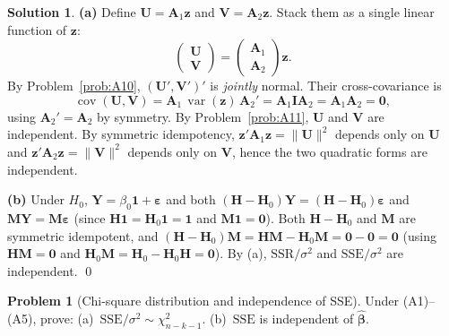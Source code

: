 \documentclass[12pt,a4paper]{article}
\theoremstyle{definition}
\newtheorem{exercise}{Problem}
\newtheorem*{solution*}{Solution}
\DeclareMathOperator\var{var}
\DeclareMathOperator\cov{cov}
\newcommand{\SSR}{\mathrm{SSR}}
\newcommand{\SSE}{\mathrm{SSE}}
\newcommand{\bY}{\mathbf{Y}}
\def\bb{\boldsymbol{\beta}}
\newcommand{\be}{\boldsymbol{\varepsilon}}
\newcommand{\bI}{\mathbf{I}}
\newcommand{\bH}{\mathbf{H}}
\newcommand{\bM}{\mathbf{M}}
\newcommand{\bone}{\mathbf{1}}
\newcommand{\bzero}{\mathbf{0}}
\newcommand{\bz}{\mathbf{z}}
\newcommand{\bA}{\mathbf{A}}
\begin{document}
\begin{solution*}
\textbf{(a)} Define $\mathbf{U} = \bA_1\bz$ and $\mathbf{V} = \bA_2\bz$. Stack them as a single linear function of $\bz$:
\[
\begin{pmatrix}\mathbf{U}\\\mathbf{V}\end{pmatrix} = \begin{pmatrix}\bA_1 \\ \bA_2\end{pmatrix}\bz.
\]
By Problem~\ref{prob:A10}, $(\mathbf{U}',\mathbf{V}')'$ is \emph{jointly} normal. Their cross-covariance is
\[
\cov(\mathbf{U},\mathbf{V}) = \bA_1\,\var(\bz)\,\bA_2' = \bA_1\bI\bA_2 = \bA_1\bA_2 = \bzero,
\]
using $\bA_2' = \bA_2$ by symmetry. By Problem~\ref{prob:A11}, $\mathbf{U}$ and $\mathbf{V}$ are independent. By symmetric idempotency, $\bz'\bA_1\bz = \|\mathbf{U}\|^2$ depends only on $\mathbf{U}$ and $\bz'\bA_2\bz = \|\mathbf{V}\|^2$ depends only on $\mathbf{V}$, hence the two quadratic forms are independent.

\textbf{(b)} Under $H_0$, $\bY = \beta_0\bone + \be$ and both $(\bH-\bH_0)\bY = (\bH-\bH_0)\be$ and $\bM\bY = \bM\be$ (since $\bH\bone = \bH_0\bone = \bone$ and $\bM\bone = \bzero$). Both $\bH-\bH_0$ and $\bM$ are symmetric idempotent, and $(\bH-\bH_0)\bM = \bH\bM - \bH_0\bM = \bzero - \bzero = \bzero$ (using $\bH\bM = \bzero$ and $\bH_0\bM = \bH_0 - \bH_0\bH = \bzero$). By (a), $\SSR/\sigma^2$ and $\SSE/\sigma^2$ are independent. \qed
\end{solution*}

\begin{exercise}[Chi-square distribution and independence of SSE]\label{prob:A14}
Under (A1)--(A5), prove: (a)~$\SSE/\sigma^2 \sim \chi^2_{n-k-1}$. (b)~$\SSE$ is independent of $\hat{\bb}$.
\end{exercise}
\end{document}
